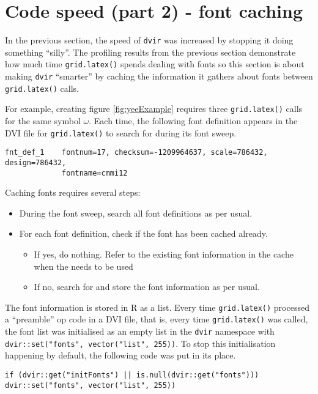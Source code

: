 \documentclass[]{article}
\begin{document}
\newpage{}

\section{Code speed (part 2) - font
caching}\label{code-speed-part-2---font-caching}

In the previous section, the speed of \texttt{dvir} was increased by
stopping it doing something ``silly''. The profiling results from the
previous section demonstrate how much time \texttt{grid.latex()} spends
dealing with fonts so this section is about making \texttt{dvir}
``smarter'' by caching the information it gathers about fonts between
\texttt{grid.latex()} calls.

For example, creating figure \ref{fig:yeeExample} requires three
\texttt{grid.latex()} calls for the same symbol \(\omega\). Each time,
the following font definition appears in the DVI file for
\texttt{grid.latex()} to search for during its font sweep.

\begin{verbatim}
fnt_def_1    fontnum=17, checksum=-1209964637, scale=786432, design=786432,
             fontname=cmmi12
\end{verbatim}

Caching fonts requires several steps:

\begin{itemize}
  \item During the font sweep, search all font definitions as per usual.
  \item For each font definition, check if the font has been cached already.
  \begin{itemize}
    \item If yes, do nothing. Refer to the existing font information in the cache when the needs to be used
    \item If no, search for and store the font information as per usual.
  \end{itemize}
\end{itemize}

The font information is stored in R as a list. Every time
\texttt{grid.latex()} processed a ``preamble'' op code in a DVI file,
that is, every time \texttt{grid.latex()} was called, the font list was
initialised as an empty list in the \texttt{dvir} namespace with
\texttt{dvir::set("fonts",\ vector("list",\ 255))}. To stop this
initialisation happening by default, the following code was put in its
place.

\begin{verbatim}
if (dvir::get("initFonts") || is.null(dvir::get("fonts"))) dvir::set("fonts", vector("list", 255))
\end{verbatim}
\end{document}
